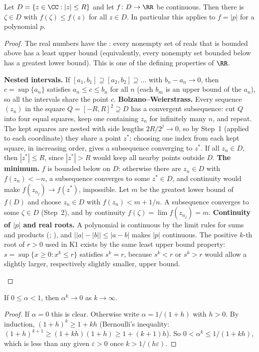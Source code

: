 \documentclass[10pt]{scrartcl}
\begin{document}
\begin{proposition*}
  Let $D=\{z\in\CC:|z|\le R\}$ and let $f\colon D\to\RR$ be continuous. Then there is $\zeta\in D$ with $f(\zeta)\le f(z)$ for all $z\in D$. In particular this applies to $f=|p|$ for a polynomial $p$.
\end{proposition*}
\begin{proof}
  The real numbers have the : every nonempty set of reals that is bounded above has a least upper bound (equivalently, every nonempty set bounded below has a greatest lower bound). This is one of the defining properties of $\RR$.
  \begin{steps}
    \ii \textbf{Nested intervals.} If $[a_1,b_1]\supseteq[a_2,b_2]\supseteq\dots$ with $b_n-a_n\to0$, then $c=\sup\{a_n\}$ satisfies $a_n\le c\le b_n$ for all $n$ (each $b_m$ is an upper bound of the $a_n$), so all the intervals share the point $c$.
    \ii \textbf{Bolzano--Weierstrass.} Every sequence $(z_n)$ in the square $Q=[-R,R]^2\supseteq D$ has a convergent subsequence: cut $Q$ into four equal squares, keep one containing $z_n$ for infinitely many $n$, and repeat. The kept squares are nested with side lengths $2R/2^j\to0$, so by Step~1 (applied to each coordinate) they share a point $z^*$; choosing one index from each kept square, in increasing order, gives a subsequence converging to $z^*$. If all $z_n\in D$, then $|z^*|\le R$, since $|z^*|>R$ would keep all nearby points outside $D$.
    \ii \textbf{The minimum.} $f$ is bounded below on $D$: otherwise there are $z_n\in D$ with $f(z_n)<-n$, a subsequence converges to some $z^*\in D$, and continuity would make $f(z_{n_j})\to f(z^*)$, impossible. Let $m$ be the greatest lower bound of $f(D)$ and choose $z_n\in D$ with $f(z_n)<m+1/n$. A subsequence converges to some $\zeta\in D$ (Step~2), and by continuity $f(\zeta)=\lim f(z_{n_j})=m$.
    \ii \textbf{Continuity of $|p|$ and real roots.} A polynomial is continuous by the limit rules for sums and products (; ), and $\bigl||a|-|b|\bigr|\le|a-b|$ makes $|p|$ continuous. The positive $k$-th root of $r>0$ used in K1 exists by the same least upper bound property: $s=\sup\{x\ge0:x^k\le r\}$ satisfies $s^k=r$, because $s^k<r$ or $s^k>r$ would allow a slightly larger, respectively slightly smaller, upper bound.
  \end{steps}
\end{proof}

\begin{proposition*}
  If $0\le\alpha<1$, then $\alpha^k\to0$ as $k\to\infty$.
\end{proposition*}
\begin{proof}
  If $\alpha=0$ this is clear. Otherwise write $\alpha=1/(1+h)$ with $h>0$. By induction, $(1+h)^k\ge1+kh$ (Bernoulli's inequality: $(1+h)^{k+1}\ge(1+kh)(1+h)\ge1+(k+1)h$). So $0<\alpha^k\le1/(1+kh)$, which is less than any given $\varepsilon>0$ once $k>1/(h\varepsilon)$.
\end{proof}
\end{document}

